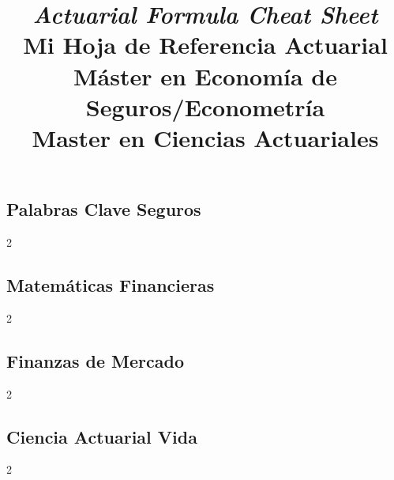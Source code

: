 \documentclass[a4paper]{article}
\title{
\author{}
\emph{Actuarial Formula Cheat Sheet}\\
Mi Hoja de Referencia Actuarial\\\medskip\small
Máster en Economía de Seguros/Econometría\\
Master en Ciencias Actuariales}
\theoremstyle{sansparenthese}
\begin{document}
\maketitle
%
 \setcounter{higher}{1}
\begin{center}

\end{center}
\newpage

\begin{center}
	\bigskip

\section*{Palabras Clave Seguros}
    \medskip
\end{center}


\begin{multicols}{2}
	

\end{multicols}

\newpage
\begin{center}
	\section*{Matemáticas Financieras}
	\medskip
\end{center}


\begin{multicols}{2}
	
	
\end{multicols}

\newpage
\begin{center}
\section*{Finanzas de Mercado}
    \medskip
\end{center}

\begin{multicols}{2}


\end{multicols}

\newpage
\begin{center}
\section*{Ciencia Actuarial Vida}
    \medskip
\end{center}

\begin{multicols}{2}
	

\end{multicols}
\end{document}
